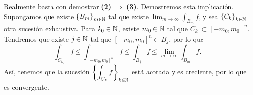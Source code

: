\begin{observation}
	Realmente basta con demostrar \textbf{(2)} $\displaystyle \Rightarrow $ \textbf{(3)}. Demostremos esta implicación. Supongamos que existe $\displaystyle \left\{ B_{m}\right\} _{m\in\mathbb{N}} $ tal que existe $\displaystyle \lim_{m \to \infty}\int _{B_{m}}f  $, y sea $\displaystyle \left\{ C_{k}\right\} _{k \in \mathbb{N}} $ otra sucesión exhaustiva. Para $\displaystyle k_{0} \in \mathbb{N} $, existe $\displaystyle m_{0} \in \mathbb{N} $ tal que $\displaystyle C_{k_{0}}\subset\left[-m_{0}, m_{0}\right] ^{n} $.
	Tendremos que existe $\displaystyle j \in \mathbb{N} $ tal que $\displaystyle \left[-m_{0}, m_{0}\right] ^{n}\subset B_{j} $, por lo que 
	\[\int _{C_{k_{0}}}f \leq \int _{\left[-m_{0}, m_{0}\right] ^{n}} f\leq \int _{B_{j}}f \leq \lim_{m \to \infty}\int _{B_{m}}f   .\]
	Así, tenemos que la sucesión $\displaystyle \left\{ \int _{C_{k}}f \right\} _{k \in \mathbb{N}} $ está acotada y es creciente, por lo que es convergente.	
\end{observation}

